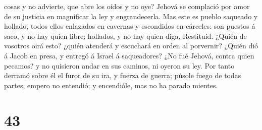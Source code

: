 cosas y no advierte, que abre los oídos y no oye?  Jehová
se complació por amor de su justicia en magnificar la ley y
engrandecerla.  Mas este es pueblo saqueado y hollado,
todos ellos enlazados en cavernas y escondidos en cárceles: son puestos
á saco, y no hay quien libre; hollados, y no hay quien diga, Restituid.
 ¿Quién de vosotros oirá esto? ¿quién atenderá y escuchará
en orden al porvernir?  ¿Quién dió á Jacob en presa, y
entregó á Israel á saqueadores? ¿No fué Jehová, contra quien pecamos? y
no quisieron andar en sus caminos, ni oyeron su ley.  Por
tanto derramó sobre él el furor de su ira, y fuerza de guerra; púsole
fuego de todas partes, empero no entendió; y encendióle, mas no ha
parado mientes.

\hypertarget{section-42}{%
\section{43}\label{section-42}}

